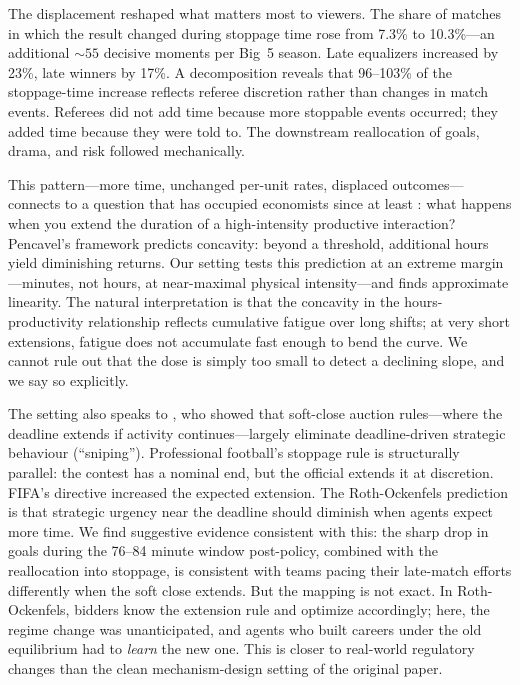 The displacement reshaped what matters most to viewers.  The share of
matches in which the result changed during stoppage time rose from 7.3\%
to 10.3\%---an additional ${\sim}55$ decisive moments per Big~5 season.  Late
equalizers increased by 23\%, late winners by 17\%.  A
\citet{gelbach2016when} decomposition reveals that 96--103\% of the
stoppage-time increase reflects referee discretion rather than
changes in match events.  Referees did not add time because more
stoppable events occurred; they added time because they were told to.
The downstream reallocation of goals, drama, and risk followed
mechanically.

\medskip

This pattern---more time, unchanged per-unit rates, displaced
outcomes---connects to a question that has occupied economists since
at least \citet{pencavel2015effects}: what happens when you extend the
duration of a high-intensity productive interaction?  Pencavel's
framework predicts concavity: beyond a threshold, additional hours yield
diminishing returns.  Our setting tests this prediction at an extreme
margin---minutes, not hours, at near-maximal physical intensity---and
finds approximate linearity.  The natural interpretation is that the
concavity in the hours-productivity relationship reflects cumulative
fatigue over long shifts; at very short extensions, fatigue does not
accumulate fast enough to bend the curve.  We cannot rule out that the
dose is simply too small to detect a declining slope, and we say so
explicitly.

The setting also speaks to \citet{rothockenfels2002}, who showed that
soft-close auction rules---where the deadline extends if activity
continues---largely eliminate deadline-driven strategic behaviour (``sniping'').
Professional football's stoppage rule is structurally parallel: the
contest has a nominal end, but the official extends it at discretion.
FIFA's directive increased the expected extension.  The Roth-Ockenfels
prediction is that strategic urgency near the deadline should diminish
when agents expect more time.  We find suggestive evidence consistent
with this: the sharp drop in goals during the 76--84 minute window
post-policy, combined with the reallocation into stoppage, is consistent
with teams pacing their late-match efforts differently when the
soft close extends.  But the mapping is not exact.  In
Roth-Ockenfels, bidders know the extension rule and optimize accordingly;
here, the regime change was unanticipated, and agents who built careers
under the old equilibrium had to \emph{learn} the new one.  This is
closer to real-world regulatory changes than the clean mechanism-design
setting of the original paper.

